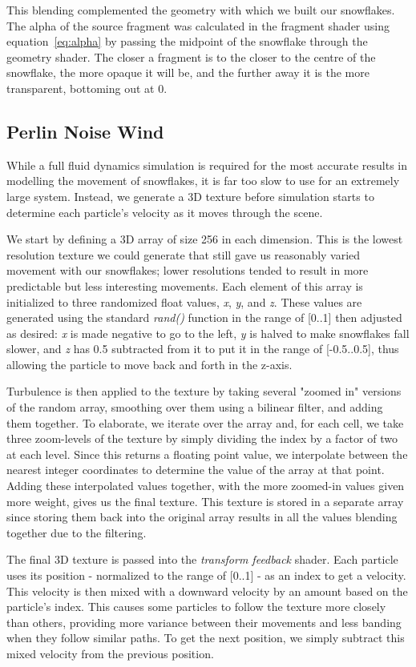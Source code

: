 \documentclass[conference]{acmsiggraph}
\begin{document}
This blending complemented the geometry with which we built our snowflakes. The alpha of the source fragment was calculated in the fragment shader using equation~\ref{eq:alpha} by passing the midpoint of the snowflake through the geometry shader. The closer a fragment is to the closer to the centre of the snowflake, the more opaque it will be, and the further away it is the more transparent, bottoming out at 0.

\subsection{Perlin Noise Wind}
While a full fluid dynamics simulation is required for the most accurate results in modelling the movement of snowflakes, it is far too slow to use for an extremely large system. Instead, we generate a 3D texture before simulation starts to determine each particle's velocity as it moves through the scene.

We start by defining a 3D array of size 256 in each dimension. This is the lowest resolution texture we could generate that still gave us reasonably varied movement with our snowflakes; lower resolutions tended to result in more predictable but less interesting movements. Each element of this array is initialized to three randomized float values, \textit{x}, \textit{y}, and \textit{z}. These values are generated using the standard \textit{rand()} function in the range of [0..1] then adjusted as desired: \textit{x} is made negative to go to the left, \textit{y} is halved to make snowflakes fall slower, and \textit{z} has 0.5 subtracted from it to put it in the range of [-0.5..0.5], thus allowing the particle to move back and forth in the z-axis.

Turbulence is then applied to the texture by taking several "zoomed in" versions of the random array, smoothing over them using a bilinear filter, and adding them together. To elaborate, we iterate over the array and, for each cell, we take three zoom-levels of the texture by simply dividing the index by a factor of two at each level. Since this returns a floating point value, we interpolate between the nearest integer coordinates to determine the value of the array at that point. Adding these interpolated values together, with the more zoomed-in values given more weight, gives us the final texture. This texture is stored in a separate array since storing them back into the original array results in all the values blending together due to the filtering.

The final 3D texture is passed into the \textit{transform feedback} shader. Each particle uses its position - normalized to the range of [0..1] -  as an index to get a velocity. This velocity is then mixed with a downward velocity by an amount based on the particle's index. This causes some particles to follow the texture more closely than others, providing more variance between their movements and less banding when they follow similar paths. To get the next position, we simply subtract this mixed velocity from the previous position.
\end{document}
